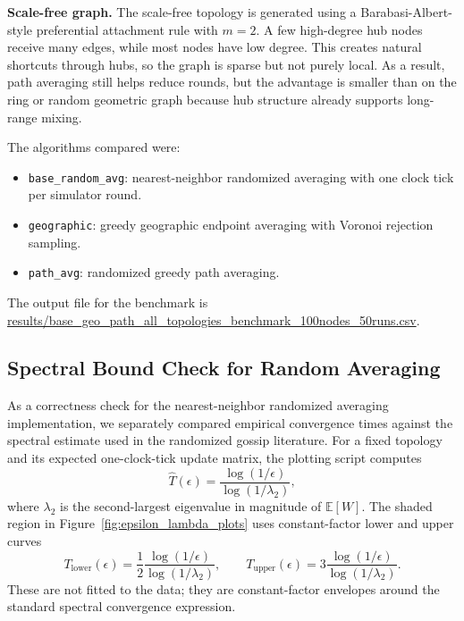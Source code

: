 \documentclass[conference]{IEEEtran}
\begin{document}
\textbf{Scale-free graph.}
The scale-free topology is generated using a Barabasi-Albert-style preferential attachment rule with $m=2$. A few high-degree hub nodes receive many edges, while most nodes have low degree. This creates natural shortcuts through hubs, so the graph is sparse but not purely local. As a result, path averaging still helps reduce rounds, but the advantage is smaller than on the ring or random geometric graph because hub structure already supports long-range mixing.

The algorithms compared were:
\begin{itemize}
    \item \texttt{base\_random\_avg}: nearest-neighbor randomized averaging with one clock tick per simulator round.
    \item \texttt{geographic}: greedy geographic endpoint averaging with Voronoi rejection sampling.
    \item \texttt{path\_avg}: randomized greedy path averaging.
\end{itemize}
The output file for the benchmark is \url{results/base_geo_path_all_topologies_benchmark_100nodes_50runs.csv}.

\subsection{Spectral Bound Check for Random Averaging}
As a correctness check for the nearest-neighbor randomized averaging implementation, we separately compared empirical convergence times against the spectral estimate used in the randomized gossip literature. For a fixed topology and its expected one-clock-tick update matrix, the plotting script computes
\begin{equation}
    \widehat{T}(\epsilon)
    =
    \frac{\log(1/\epsilon)}{\log(1/\lambda_2)},
    \label{eq:lambda_runtime_estimate}
\end{equation}
where $\lambda_2$ is the second-largest eigenvalue in magnitude of $\mathbb{E}[W]$. The shaded region in Figure~\ref{fig:epsilon_lambda_plots} uses constant-factor lower and upper curves
\begin{equation}
    T_{\mathrm{lower}}(\epsilon)
    =
    \frac{1}{2}
    \frac{\log(1/\epsilon)}{\log(1/\lambda_2)},
    \qquad
    T_{\mathrm{upper}}(\epsilon)
    =
    3
    \frac{\log(1/\epsilon)}{\log(1/\lambda_2)}.
    \label{eq:lambda_bounds}
\end{equation}
These are not fitted to the data; they are constant-factor envelopes around the standard spectral convergence expression.
\end{document}
